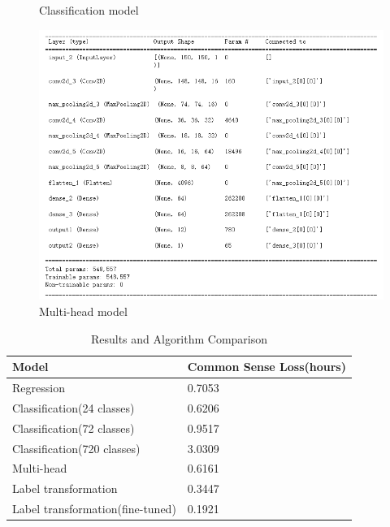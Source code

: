 \documentclass{article}
\begin{document}
\begin{figure}[!h]
\begin{minipage}[t]{0.3\textwidth}
		\caption{Classification model}
		\label{fig:classification}
	\end{minipage}
	\begin{minipage}[t]{0.3\textwidth}%
		\centering
		\includegraphics[width=\textwidth]{multi-head.png}
		\caption{Multi-head model}
		\label{fig:multi-head}
	\end{minipage}
\end{figure}
    \begin{table}[!ht]
	\caption{Results and Algorithm Comparison}
	\label{tab:performance}
	\centering
	\begin{tabular}{ll}
		\toprule
		\textbf{Model} & \textbf{Common Sense Loss(hours)} \\
		\midrule
		Regression & 0.7053 \\
		Classification(24 classes) & 0.6206 \\
		Classification(72 classes) & 0.9517 \\
		Classification(720 classes) & 3.0309 \\
		Multi-head & 0.6161 \\
		Label transformation & 0.3447 \\
		Label transformation(fine-tuned) & 0.1921 \\
		\bottomrule
	\end{tabular}
\end{table}
\end{document}
